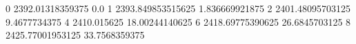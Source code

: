 0 2392.01318359375 0.0
1 2393.849853515625 1.836669921875
2 2401.48095703125 9.4677734375
4 2410.015625 18.00244140625
6 2418.69775390625 26.6845703125
8 2425.77001953125 33.7568359375
